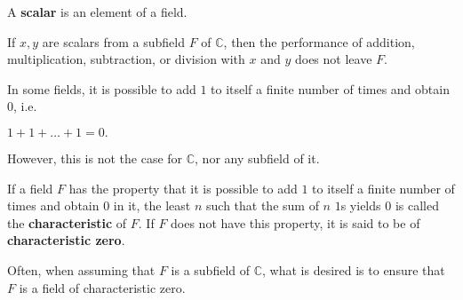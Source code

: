 \documentclass[12pt]{article}
\begin{document}
\begin{defn}
  A \textbf{scalar} is an element of a field.
\end{defn}

\begin{comm}
  If $x, y$ are scalars from a subfield $F$ of $\mathbb{C}$, then
  the performance of addition, multiplication, subtraction, or
  division with $x$ and $y$ does not leave $F$.
\end{comm}

\begin{comm}
  In some fields, it is possible to add $1$ to itself a finite
  number of times and obtain $0$, i.e.
  \begin{center}
    $1 + 1 + … + 1 = 0.$
  \end{center}
  However, this is not the case for $\mathbb{C}$, nor any
  subfield of it.
\end{comm}

\begin{defn}
  If a field $F$ has the property that it is possible to add $1$
  to itself a finite number of times and obtain $0$ in it, the
  least $n$ such that the sum of $n$ $1$s yields $0$ is called
  the \textbf{characteristic} of $F$. If $F$ does not have this
  property, it is said to be of \textbf{characteristic zero}.
\end{defn}

\begin{comm}
  Often, when assuming that $F$ is a subfield of $\mathbb{C}$,
  what is desired is to ensure that $F$ is a field of
  characteristic zero.
\end{comm}
\end{document}
